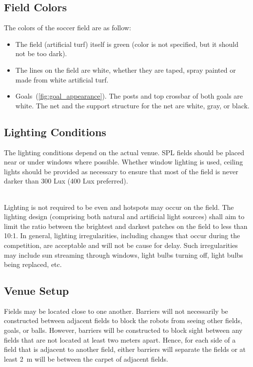 \subsection{Field Colors}
\label{sec:field_colors}
The colors of the soccer field are as follow:

\begin{itemize}

\item The field (artificial turf) itself is green (color is not specified, but it should not be too dark).

\item The lines on the field are white, whether they are taped, spray painted or made from white artificial turf.

\item Goals~(\cf \cref{fig:goal_appearance}). The posts and top crossbar of both goals are white. The net and the support structure for the net are white, gray, or black.

\end{itemize}

\subsection{Lighting Conditions}
\label{sec:lightConditions}
The lighting conditions depend on the actual venue. SPL fields should be placed near or under windows where possible. Whether window lighting is used, ceiling lights should be provided as necessary to ensure that most of the field is never darker than 300 Lux (400 Lux preferred).

 \\

Lighting is not required to be even and hotspots may occur on the field. The lighting design (comprising both natural and artificial light sources) shall aim to limit the ratio between the brightest and darkest patches on the field to less than 10:1. In general, lighting irregularities, including changes that occur during the competition, are acceptable and will not be cause for delay.  Such irregularities may include sun streaming through windows, light bulbs turning off, light bulbs being replaced, etc.

\subsection{Venue Setup}
\label{sec:boundaries}
Fields may be located close to one another.  Barriers will not necessarily be constructed between adjacent fields to block the robots from seeing other fields, goals, or balls. However, barriers will be constructed to block sight between any fields that are not located at least two meters apart. Hence, for each side of a field that is adjacent to another field, either barriers will separate the fields or at least \qty{2}{\metre} will be between the carpet of adjacent fields.

